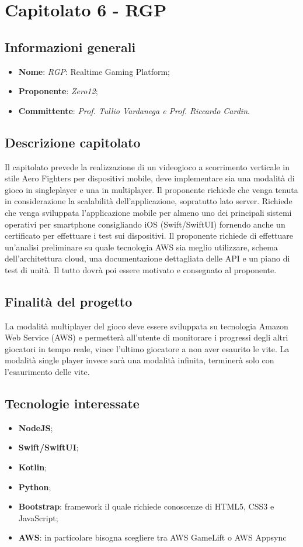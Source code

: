 \section{Capitolato 6 - RGP}
\subsection{Informazioni generali}
\begin{itemize}
    \item \textbf{Nome}: \emph{RGP}: Realtime Gaming Platform;
    \item \textbf{Proponente}: \emph{Zero12};
    \item \textbf{Committente}: \emph{Prof. Tullio Vardanega e Prof. Riccardo Cardin}.
\end{itemize}
\subsection{Descrizione capitolato}
Il capitolato prevede la realizzazione di un videogioco a scorrimento verticale in stile Aero Fighters per dispositivi mobile, deve implementare sia una modalità di gioco in singleplayer e una in multiplayer.
Il proponente richiede che venga tenuta in considerazione la scalabilità dell'applicazione, sopratutto lato server.
Richiede che venga sviluppata l'applicazione mobile per almeno uno dei principali sistemi operativi per smartphone consigliando iOS (Swift/SwiftUI) fornendo anche un certificato per effettuare i test sui dispositivi.
Il proponente richiede di effettuare un'analisi preliminare su quale tecnologia AWS sia meglio utilizzare, schema dell'architettura cloud, una documentazione dettagliata delle API e un piano di test di unità. Il tutto dovrà poi essere motivato e consegnato al proponente.
\subsection{Finalità del progetto}
La modalità multiplayer del gioco deve essere sviluppata su tecnologia Amazon Web Service (AWS) e permetterà all'utente di monitorare i progressi degli altri giocatori in tempo reale, vince l'ultimo giocatore a non aver esaurito le vite. 
La modalità single player invece sarà una modalità infinita, terminerà solo con l'esaurimento delle vite.
\subsection{Tecnologie interessate}
\begin{itemize}
    \item \textbf{NodeJS};
	\item \textbf{Swift/SwiftUI};
	\item \textbf{Kotlin};
	\item \textbf{Python};
	\item \textbf{Bootstrap}: framework il quale richiede conoscenze di HTML5, CSS3 e JavaScript;
	\item \textbf{AWS}: in particolare bisogna scegliere tra AWS GameLift o AWS Appsync
\end{itemize}
